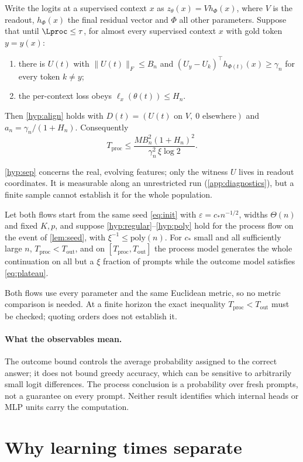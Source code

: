\begin{proposition}\label{prop:separable}
Write the logits at a supervised context $x$ as $z_\theta(x)=V h_\Phi(x)$, where $V$ is the readout, $h_\Phi(x)$ the final residual vector and $\Phi$ all other parameters. Suppose that until $\Lproc\le\tau$, for almost every supervised context $x$ with gold token $y=y(x)$:
\begin{enumerate}[label=(B\arabic*),ref=(B\arabic*),leftmargin=*,itemsep=2pt]
\item\label{hyp:sep} there is $U(t)$ with $\|U(t)\|_F\le B_n$ and $(U_y-U_k)^\top h_{\Phi(t)}(x)\ge\gamma_n$ for every token $k\ne y$;
\item\label{hyp:lossbd} the per-context loss obeys $\ell_x(\theta(t))\le H_n$.
\end{enumerate}
Then \ref{hyp:align} holds with $D(t)=(U(t)\text{ on }V,\ 0\text{ elsewhere})$ and $a_n=\gamma_n/(1+H_n)$. Consequently
\begin{equation}\label{eq:sep-time}
T_{\mathrm{proc}}\le\frac{M B_n^2(1+H_n)^2}{\gamma_n^2\,\xi\log2}.
\end{equation}
\end{proposition}
\ref{hyp:sep} concerns the real, evolving features; only the witness $U$ lives in readout coordinates. It is measurable along an unrestricted run (\cref{app:diagnostics}), but a finite sample cannot establish it for the whole population.

\begin{corollary}\label{cor:separation}
Let both flows start from the same seed \cref{eq:init} with $\varepsilon=c_*n^{-1/2}$, widths $\Theta(n)$ and fixed $K,p$, and suppose \ref{hyp:regular}--\ref{hyp:poly} hold for the process flow on the event of \cref{lem:seed}, with $\xi^{-1}\le\mathrm{poly}(n)$. For $c_*$ small and all sufficiently large $n$, $T_{\mathrm{proc}}<T_{\mathrm{out}}$, and on $[T_{\mathrm{proc}},T_{\mathrm{out}}]$ the process model generates the whole continuation on all but a $\xi$ fraction of prompts while the outcome model satisfies \cref{eq:plateau}.
\end{corollary}
Both flows use every parameter and the same Euclidean metric, so no metric comparison is needed. At a finite horizon the exact inequality $T_{\mathrm{proc}}<T_{\mathrm{out}}$ must be checked; quoting orders does not establish it.

\paragraph{What the observables mean.}
The outcome bound controls the average probability assigned to the correct answer; it does not bound greedy accuracy, which can be sensitive to arbitrarily small logit differences. The process conclusion is a probability over fresh prompts, not a guarantee on every prompt. Neither result identifies which internal heads or MLP units carry the computation.

\section{Why learning times separate}\label{sec:credit}
